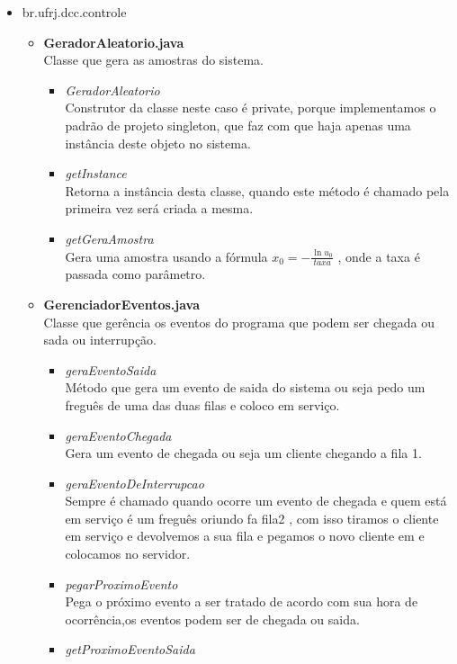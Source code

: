 \documentclass[a4paper,10pt]{article}
\begin{document}
      \begin{itemize}
	  \item br.ufrj.dcc.controle
	      \begin{itemize}
		\item \textbf{GeradorAleatorio.java\\}
		      Classe que gera as amostras do sistema.
		    \begin{itemize}
			\item \textit{GeradorAleatorio\\}
			 Construtor da classe neste caso é private, porque implementamos o padrão de projeto singleton, que faz com que haja apenas uma instância deste objeto no sistema.
			\item \textit{getInstance\\} 
			  Retorna a instância desta classe, quando este método é chamado pela primeira vez será criada a mesma.  
			\item \textit{getGeraAmostra\\}
			  Gera uma amostra usando a fórmula $x_0 = -\frac{\ln u_0}{taxa}$ , onde a taxa é passada como parâmetro.
		    \end{itemize}
		\item \textbf{GerenciadorEventos.java\\}
			 Classe que gerência os eventos do programa que podem ser chegada ou sada ou interrupção.
		     \begin{itemize}
			\item \textit{geraEventoSaida\\}
			 Método que gera um evento de saida do sistema ou seja pedo um freguês de uma das duas filas e coloco em serviço.
			\item \textit{geraEventoChegada\\}
			 Gera um evento de chegada ou seja um cliente chegando a fila 1.
			\item \textit{geraEventoDeInterrupcao\\}
			  Sempre é chamado quando ocorre um evento de chegada e quem está em serviço é um freguês oriundo fa fila2 , com isso tiramos o cliente em serviço e devolvemos a sua fila e pegamos o novo cliente em 
			  e colocamos no servidor.
			\item \textit{pegarProximoEvento\\}
			  Pega o próximo evento a ser tratado de acordo com sua hora de ocorrência,os eventos podem ser de chegada ou saida.
			\item \textit{getProximoEventoSaida\\}

\end{itemize}
\end{itemize}
\end{itemize}
\end{document}
